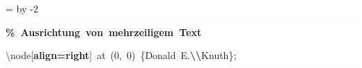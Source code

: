 \begingroup
\ttfamily
{}
=\textwidth
\advance{} by -2\fboxsep
\noindent
\colorbox{background}
{%
\parbox{\dimen255}
{%
\rule[-0.5ex]{0pt}{2.5ex}\hspace*{0.0em}\textcolor{G}{\textbf{\%~Ausrichtung~von~mehrzeiligem~Text}}\\
\rule[-0.5ex]{0pt}{2.5ex}\hspace*{0.0em}\textbackslash{}node[\textcolor{R}{\textbf{align=right}}]~at~(0,~0)~\{Donald~E.\textcolor{R}{\textbf{\textbackslash{}\textbackslash{}}}Knuth\};}%
}%
\endgroup
